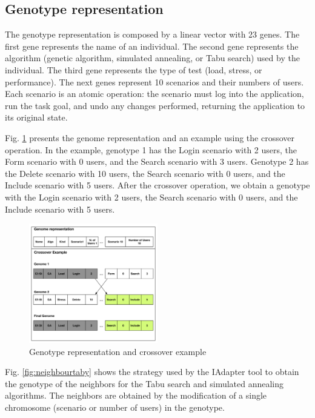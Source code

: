 \documentclass[conference]{IEEEtran}
\begin{document}
\subsection{Genotype representation}

The genotype representation is composed by a linear vector with 23 genes. The first gene represents the name of an individual. The second gene represents the algorithm (genetic algorithm, simulated annealing, or Tabu search) used by the individual. The third gene represents the type of test (load, stress, or performance). The next genes represent 10 scenarios and their numbers of users. Each scenario is an atomic operation: the scenario must log into the application, run the task goal, and undo any changes performed, returning the application to its original state.

Fig. \ref{fig:genomarepresentation} presents the genome representation and an example using the crossover operation. In the example, genotype 1 has the Login scenario with 2 users, the Form scenario with 0 users, and the Search scenario with 3 users. Genotype 2 has the Delete scenario with 10 users, the Search scenario with 0 users, and the Include scenario with 5 users. After the crossover operation, we obtain a genotype with the Login scenario with 2 users, the Search scenario with 0 users, and the Include scenario with 5 users.

\begin{figure}[h]
\includegraphics[width=0.5\textwidth]{./images/genomerepresentation.png}
\caption{Genotype representation and crossover example}
\label{fig:genomarepresentation}
\end{figure}

Fig. \ref{fig:neighbourtaby} shows the strategy used by the IAdapter tool to obtain the genotype of the neighbors for the Tabu search and simulated annealing algorithms. The neighbors are obtained by the modification of a single chromosome (scenario or number of users) in the genotype.
\end{document}
